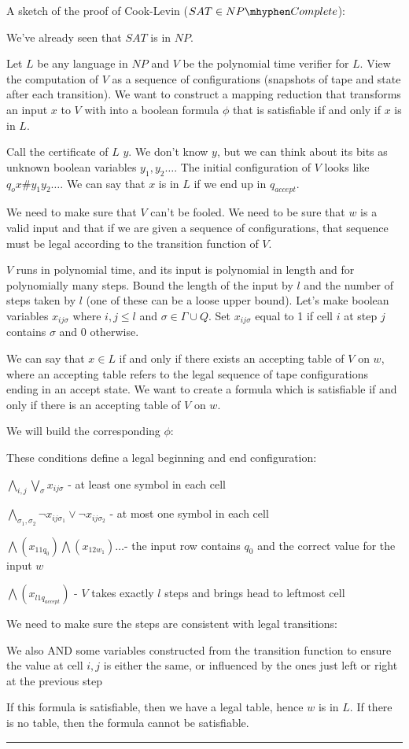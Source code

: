 \documentclass[twoside]{article}
\newenvironment{proof}{{\bf Proof:}}{\hfill\rule{2mm}{2mm}}
\begin{document}
\begin{proof}
	A sketch of the proof of Cook-Levin ($SAT\in NP\mhyphen Complete$):
	
	We've already seen that $SAT$ is in $NP$.
	
	Let $L$ be any language in $NP$ and $V$ be the polynomial time verifier for $L$.  View the computation of $V$ as a sequence of configurations (snapshots of tape and state after each transition).  We want to construct a mapping reduction that transforms an input $x$ to $V$ with into a boolean formula $\phi$ that is satisfiable if and only if $x$ is in $L$.  
	
	Call the certificate of $L$ $y$.  We don't know $y$, but we can think about its bits as unknown boolean variables $y_1,y_2\dots$.  The initial configuration of $V$ looks like $q_o x \# y_1y_2\dots$.  We can say that $x$ is in $L$ if we end up in $q_{accept}$.  
	
	We need to make sure that $V$ can't be fooled.  We need to be sure that $w$ is a valid input and that if we are given a sequence of configurations, that sequence must be legal according to the transition function of $V$.
	
	$V$ runs in polynomial time, and its input is polynomial in length and for polynomially many steps.  Bound the length of the input by $l$ and the number of steps taken by $l$ (one of these can be a loose upper bound).  Let's make boolean variables $x_{ij\sigma}$ where $i,j \leq l$ and $\sigma \in \Gamma\cup Q$.  Set $x_{ij\sigma}$ equal to 1 if cell $i$ at step $j$ contains $\sigma$ and 0 otherwise.
	
	We can say that $x\in L$ if and only if there exists an accepting table of $V$ on $w$, where an accepting table refers to the legal sequence of tape configurations ending in an accept state.  We want to create a formula which is satisfiable if and only if there is an accepting table of $V$ on $w$.
	
	We will build the corresponding $\phi$:
	
	These conditions define a legal beginning and end configuration:
	
	$\bigwedge\limits_{i,j} \bigvee\limits_\sigma x_{ij\sigma}$ - at least one symbol in each cell
	
	$\bigwedge\limits_{\sigma_1 , \sigma_2} \lnot x_{ij\sigma_1} \lor \lnot x_{ij\sigma_2}$ - at most one symbol in each cell
	
	$\bigwedge (x_{11q_0})\bigwedge(x_{12w_1})\dots$- the input row contains $q_0$ and the correct value for the input $w$
	
	$ \bigwedge (x_{l1q_{accept}})$ - $V$ takes exactly $l$ steps and brings head to leftmost cell
	
	We need to make sure the steps are consistent with legal transitions:
	
We also AND some variables constructed from the transition function to ensure the value at cell $i,j$ is either the same, or influenced by the ones just left or right at the previous step


If this formula is satisfiable, then we have a legal table, hence $w$ is in $L$.  If there is no table, then the formula cannot be satisfiable.
\end{proof}
\end{document}
